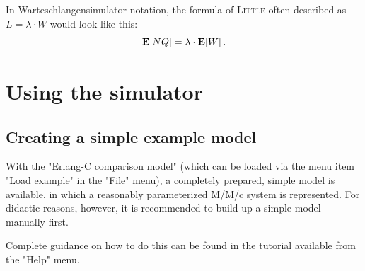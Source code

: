 \documentclass{svmono}
\begin{document}
In Warteschlangensimulator notation, the formula of \textsc{Little} often described as $L=\lambda\cdot W$ would look like this:
$$
{\bf E}[NQ]=\lambda\cdot{\bf E}[W]\,.
$$



\chapter{Using the simulator}

\section{Creating a simple example model}

With the "Erlang-C comparison model" (which can be loaded via the menu item "Load example" in the "File" menu), a completely prepared, simple model is available, in which a reasonably parameterized M/M/c system is represented. For didactic reasons, however, it is recommended to build up a simple model manually first.

Complete guidance on how to do this can be found in the tutorial available from the "Help" menu.
\end{document}
